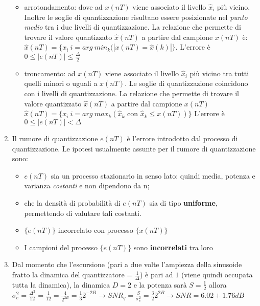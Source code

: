 \documentclass[
]{article}
\begin{document}
\begin{enumerate}
  \begin{itemize}
  \item
    arrotondamento: dove ad \(x(nT)\) viene associato il livello
    \(\hat{x}_i\) più vicino. Inoltre le soglie di quantizzazione
    risultano essere posizionate nel \emph{punto medio} tra i due
    livelli di quantizzazione. La relazione che permette di trovare il
    valore quantizzato \(\hat{x}(nT)\) a partire dal campione \(x(nT)\)
    è: \(\hat{x}(nT) = \{x_i \: i=arg \ min_k (|x(nT)=\hat{x}(k)| \}\).
    L'errore è \(0 \leq |e(nT)| \leq \frac{\Delta}{2}\)
  \item
    troncamento: ad \(x(nT)\) viene associato il livello \(\hat{x}_i\)
    più vicino tra tutti quelli minori o uguali a \(x(nT)\). Le soglie
    di quantizzazione coincidono con i livelli di quantizzazione. La
    relazione che permette di trovare il valore quantizzato
    \(\hat{x}(nT)\) a partire dal campione \(x(nT)\)
    \(\hat{x}(nT) = \{x_i \: i=arg \ max_k (\hat{x}_k \text{ con } \hat{x}_k \leq x(nT)) \}\)
    L'errore è \(0 \leq |e(nT)| < \Delta\)
  \end{itemize}
\item
  Il rumore di quantizzazione \(e(nT)\) è l'errore introdotto dal
  processo di quantizzazione. Le ipotesi usualmente assunte per il
  rumore di quantizzazione sono:

  \begin{itemize}
  \item
    \(e(nT)\) sia un processo stazionario in senso lato: quindi media,
    potenza e varianza \emph{costanti} e non dipendono da n;
  \item
    che la densità di probabilità di \(e(nT)\) sia di tipo
    \textbf{uniforme}, permettendo di valutare tali costanti.
  \item
    \(\{e(nT)\}\) incorrelato con processo \(\{x(nT)\}\)
  \item
    I campioni del processo \(\{e(nT)\}\) sono \textbf{incorrelati} tra
    loro
  \end{itemize}
\item
  Dal momento che l'escursione (pari a due volte l'ampiezza della
  sinusoide fratto la dinamica del quantizzatore = \(\frac{1}{\Delta}\))
  è pari ad \(1\) (viene quindi occupata tutta la dinamica), la dinamica
  \(D=2\) e la potenza sarà \(S=\frac{1}{2}\) allora
  \(\sigma^2_e = \frac{\Delta^2}{12}=\frac{1}{12} = \frac{4}{2^{2B}}=\frac{1}{3} 2^{-2B} \to SNR_q=\frac{S}{\sigma^2_e}=\frac{3}{2}2^{2B} \to SNR=6.02+1.76dB\)
\end{enumerate}
\end{document}
